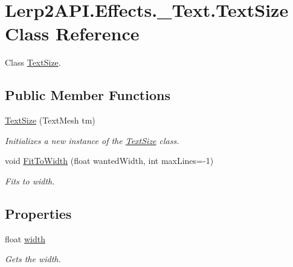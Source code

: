 \hypertarget{class_lerp2_a_p_i_1_1_effects_1_1___text_1_1_text_size}{}\section{Lerp2\+A\+P\+I.\+Effects.\+\_\+\+Text.\+Text\+Size Class Reference}
\label{class_lerp2_a_p_i_1_1_effects_1_1___text_1_1_text_size}


Class \hyperlink{class_lerp2_a_p_i_1_1_effects_1_1___text_1_1_text_size}{Text\+Size}.  


\subsection*{Public Member Functions}
\begin{DoxyCompactItemize}
\item 
\hyperlink{class_lerp2_a_p_i_1_1_effects_1_1___text_1_1_text_size_a9c132b03a4fd16e87dd94ef795865794}{Text\+Size} (Text\+Mesh tm)
\begin{DoxyCompactList}\small\item\em Initializes a new instance of the \hyperlink{class_lerp2_a_p_i_1_1_effects_1_1___text_1_1_text_size}{Text\+Size} class. \end{DoxyCompactList}\item 
void \hyperlink{class_lerp2_a_p_i_1_1_effects_1_1___text_1_1_text_size_a0c6897519bc5cdfe748913284134789d}{Fit\+To\+Width} (float wanted\+Width, int max\+Lines=-\/1)
\begin{DoxyCompactList}\small\item\em Fits to width. \end{DoxyCompactList}\end{DoxyCompactItemize}
\subsection*{Properties}
\begin{DoxyCompactItemize}
\item 
float \hyperlink{class_lerp2_a_p_i_1_1_effects_1_1___text_1_1_text_size_a6b1f559c98135440756b77e91def5f09}{width}
\begin{DoxyCompactList}\small\item\em Gets the width. \end{DoxyCompactList}\end{DoxyCompactItemize}


